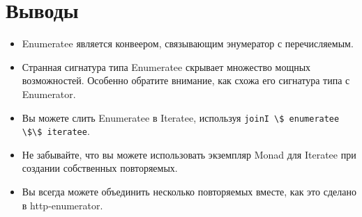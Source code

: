 \section{Выводы}

\begin{itemize}
\item Enumeratee является конвеером, связывающим энумератор с перечисляемым.
\item Странная сигнатура типа Enumeratee скрывает множество мощных возможностей. Особенно обратите внимание, как схожа его сигнатура типа с Enumerator.
\item Вы можете слить Enumeratee в Iteratee, используя \lstinline'joinI \$ enumeratee \$\$ iteratee'.
\item Не забывайте, что вы можете использовать экземпляр Monad для Iteratee при создании собственных повторяемых.
\item Вы всегда можете объединить несколько повторяемых вместе, как это сделано в http-enumerator.
\end{itemize}
